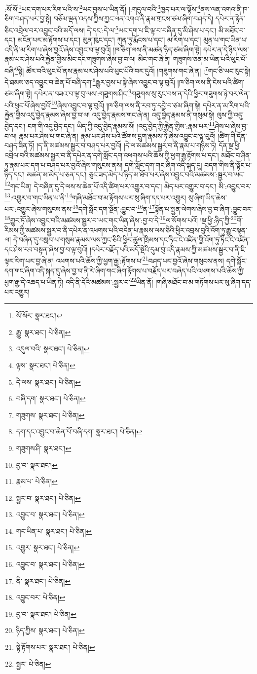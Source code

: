 :སོ་སོ་\footnote{སོ་སོར་  སྣར་ཐང་། }ཡང་དག་པར་རིག་པའི་ས་\footnote{རྒྱུ་  སྣར་ཐང་།  པེ་ཅིན། }ཡང་བྱས་པ་ཡིན་ནོ། །:གདུལ་བའི་\footnote{འདུལ་བའི་  སྣར་ཐང་།  པེ་ཅིན། }ཁྱད་པར་ལ་ལྟོས་\footnote{ལྟས་  སྣར་ཐང་།  པེ་ཅིན། }ནས་ལན་འགའ་ནི་ཁ་ཅིག་བཤད་པར་བྱ་སྟེ། བཅོམ་ལྡན་འདས་ཀྱིས་ཀྱང་ལན་འགའ་ནི་རྣམ་གྲངས་ཙམ་ཞིག་བཤད་དེ། དཔེར་ན་རྟེན་ཅིང་འབྲེལ་བར་འབྱུང་བའི་མདོ་ལས། དེ་དང་:དེ་ལ་\footnote{དེ་ལས་  སྣར་ཐང་།  པེ་ཅིན། }ཡང་དག་པ་ཇི་ལྟ་བ་བཞིན་དུ་མི་ཤེས་པ་དང་། མི་མཐོང་བ་དང་། མངོན་པར་མ་རྟོགས་པ་དང་། མུན་ཁུང་དང་། ཀུན་ཏུ་རྨོངས་པ་དང་། མ་རིག་པ་དང་། མུན་པ་གང་ཡིན་པ་འདི་ནི་མ་རིག་པ་ཞེས་བྱའོ་ཞེས་འབྱུང་བ་ལྟ་བུའོ། །ཁ་ཅིག་ལས་ནི་མཚན་ཉིད་ཙམ་ཞིག་སྟེ། དཔེར་ན་དེ་ཉིད་ལས་རྣམ་པར་ཤེས་པའི་རྐྱེན་གྱིས་མིང་དང་གཟུགས་ཞེས་བྱ་བ་ལ། མིང་གང་ཞེ་ན། གཟུགས་ཅན་མ་ཡིན་པའི་ཕུང་པོ་བཞི་\footnote{བཞི་དག་  སྣར་ཐང་།  པེ་ཅིན། }སྟེ། ཚོར་བའི་ཕུང་པོ་ནས་རྣམ་པར་ཤེས་པའི་ཕུང་པོའི་བར་དུའོ། །གཟུགས་གང་ཞེ་ན། :\footnote{གཟུགས་  སྣར་ཐང་།  པེ་ཅིན། }གང་ཅི་ཡང་རུང་སྟེ། དེ་ཐམས་ཅད་འབྱུང་བ་ཆེན་པོ་བཞི་དག་\footnote{དག་དང་འབྱུང་བ་ཆེན་པོ་བཞི་དག་  སྣར་ཐང་།  པེ་ཅིན། }རྒྱུར་བྱས་པ་སྟེ་ཞེས་འབྱུང་བ་ལྟ་བུའོ། །ཁ་ཅིག་ལས་ནི་ངེས་པའི་ཚིག་ཙམ་ཞིག་སྟེ། དཔེར་ན་བཟའ་བ་ལྟ་བུ་ལས་:གཟུགས་ཤིང་\footnote{གཟུགས་ཤི་  སྣར་ཐང་། }གཟུགས་སུ་རུང་བས་ན་དེའི་ཕྱིར་གཟུགས་ཉེ་བར་ལེན་པའི་ཕུང་པོ་ཞེས་བྱའོ་\footnote{བྱ་བ་  སྣར་ཐང་། }ཞེས་འབྱུང་བ་ལྟ་བུའོ། །ཁ་ཅིག་ལས་ནི་རབ་ཏུ་དབྱེ་བ་ཙམ་ཞིག་སྟེ། དཔེར་ན་མ་རིག་པའི་རྐྱེན་གྱིས་འདུ་བྱེད་རྣམས་ཞེས་བྱ་བ་ལ། འདུ་བྱེད་རྣམས་གང་ཞེ་ན། འདུ་བྱེད་རྣམས་ནི་གསུམ་སྟེ། ལུས་ཀྱི་འདུ་བྱེད་དང་། ངག་གི་འདུ་བྱེད་དང་། ཡིད་ཀྱི་འདུ་བྱེད་རྣམས་སོ། །འདུ་བྱེད་ཀྱི་རྐྱེན་གྱིས་:རྣམ་པར་\footnote{རྣམ་པ་  པེ་ཅིན། }ཤེས་པ་ཞེས་བྱ་བ་ལ། རྣམ་པར་ཤེས་པ་གང་ཞེ་ན། རྣམ་པར་ཤེས་པའི་ཚོགས་དྲུག་རྣམས་ཏེ་ཞེས་འབྱུང་བ་ལྟ་བུའོ། །ཚིག་གི་དོན་བཤད་ཟིན་ཏོ། །ད་ནི་མཚམས་སྦྱར་བ་བཤད་པར་བྱའོ། །དེ་ལ་མཚམས་སྦྱར་བ་ནི་རྣམ་པ་གཉིས་ཏེ། དོན་སྔ་ཕྱི་འབྲེལ་བའི་མཚམས་སྦྱར་བ་ནི་དཔེར་ན་དགེ་སློང་དག་འཕགས་པའི་ཆོས་ཀྱི་ཕྱག་རྒྱ་རྟོགས་པ་དང་། མཐོང་བ་ཤིན་ཏུ་རྣམ་པར་དག་པ་བཤད་པར་བྱའོ་ཞེས་གསུངས་ནས། དགེ་སློང་དག་གང་ཞིག་འདི་སྐད་དུ། བདག་གིས་ནི་སྟོང་པ་ཉིད་དང་། མཚན་མ་མེད་པ་ཅན་དང་། ཅུང་ཟད་མེད་པ་ཉིད་མ་ཐོབ་པར་ཞེས་འབྱུང་བའི་མཚམས་:སྦྱར་བ་ཡང་\footnote{སྦྱར་བ་  སྣར་ཐང་།  པེ་ཅིན། }གང་ཡིན། དེ་བཞིན་དུ་དེ་ལས་ས་ཆེན་པོ་འདི་ཚིག་པར་འགྱུར་བ་དང་། མེད་པར་འགྱུར་བ་དང་། མི་:འབྱུང་བར་\footnote{འབྱུང་བ་  སྣར་ཐང་།  པེ་ཅིན། }:འགྱུར་བ་གང་ཡིན་པ་ནི་\footnote{གང་ཡིན་པ་  སྣར་ཐང་།  པེ་ཅིན། }གཞི་མཐོང་བ་མ་རྟོགས་པར་སུ་ཞིག་དད་པར་འགྱུར། སུ་ཞིག་ཡིད་ཆེས་པར་:འགྱུར་ཞེས་གསུངས་ནས་\footnote{འགྱུར་  སྣར་ཐང་།  པེ་ཅིན། }དགེ་སློང་དག་སྔོན་:བྱུང་བ་\footnote{འབྱུང་བ་  སྣར་ཐང་།  པེ་ཅིན། }ན་\footnote{ནི་  སྣར་ཐང་།  པེ་ཅིན། }སྟོན་པ་སྤྱན་ལེགས་ཞེས་བྱ་བ་ཞིག་:བྱུང་བར་\footnote{འབྱུང་བར་  པེ་ཅིན། }གྱུར་ཏོ་ཞེས་འབྱུང་བའི་མཚམས་སྦྱར་བ་ཡང་གང་ཡིན་ཞེས་:བྱ་བ་དེ་\footnote{བྱ་བ་  སྣར་ཐང་།  པེ་ཅིན། }ལ་སོགས་པའོ། །སྔ་ཕྱི་:ཉིད་ཀྱི་\footnote{ཉིད་ཀྱིས་  སྣར་ཐང་།  པེ་ཅིན། }གོ་རིམས་ཀྱི་མཚམས་སྦྱར་བ་ནི་དཔེར་ན་འཕགས་པའི་བདེན་པ་རྣམས་ལས་ཅིའི་ཕྱིར་འབྲས་བུའི་འོག་ཏུ་རྒྱུ་བསྟན་ལ། དེ་བཞིན་དུ་བསླབ་པ་གསུམ་རྣམས་ལས་ཀྱང་ཅིའི་ཕྱིར་ཚུལ་ཁྲིམས་དང་ཏིང་ངེ་འཛིན་གྱི་འོག་ཏུ་ཏིང་ངེ་འཛིན་དང་ཤེས་རབ་བསྟན་ཞེས་བྱ་བ་ལྟ་བུའོ། །དཔེར་བརྗོད་པའི་མདོ་སྡེའི་དུམ་བུ་འདི་རྣམས་ཀྱི་མཚམས་སྦྱར་བ་ནི་ཇི་ལྟར་རིག་པར་བྱ་ཞེ་ན། འཕགས་པའི་ཆོས་ཀྱི་ཕྱག་རྒྱ་:རྟོགས་པ་\footnote{སྟེ་རྟོགས་པར་  སྣར་ཐང་།  པེ་ཅིན། }བཤད་པར་བྱའོ་ཞེས་གསུངས་ནས། དགེ་སློང་དག་གང་ཞིག་འདི་སྐད་དུ་ཞེས་བྱ་བ་ནི་རེ་ཞིག་གང་ཞིག་རྟོགས་པ་བརྗོད་པར་བཞེད་པའི་འཕགས་པའི་ཆོས་ཀྱི་ཕྱག་རྒྱ་དེ་འཆད་པ་ཡིན་ཏེ། འདི་ནི་དེའི་མཚམས་:སྦྱར་བ་\footnote{སྦྱར་  པེ་ཅིན། }ཡིན་ནོ། །གཞི་མཐོང་བ་མ་གཏོགས་པར་སུ་ཞིག་དད་པར་འགྱུར། 